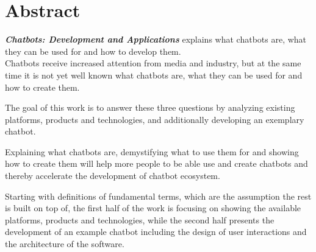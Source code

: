 \chapter*{Abstract}

\emph{\textbf{Chatbots: Development and Applications}} explains what chatbots are, what they can be used for and how to develop them.
\\

Chatbots receive increased attention from media and industry,
but at the same time it is not yet well known what chatbots are, what they can be used for and how to create them.

The goal of this work is to answer these three questions by analyzing existing platforms, products and technologies,
and additionally developing an exemplary chatbot.

Explaining what chatbots are, demystifying what to use them for and showing how to create them
will help more people to be able use and create chatbots and thereby accelerate the development of chatbot ecosystem.

Starting with definitions of fundamental terms, which are the assumption the rest is built on top of,
the first half of the work is focusing on showing the available platforms, products and technologies,
while the second half presents the development of an example chatbot including the design of user interactions and the architecture of the software.
